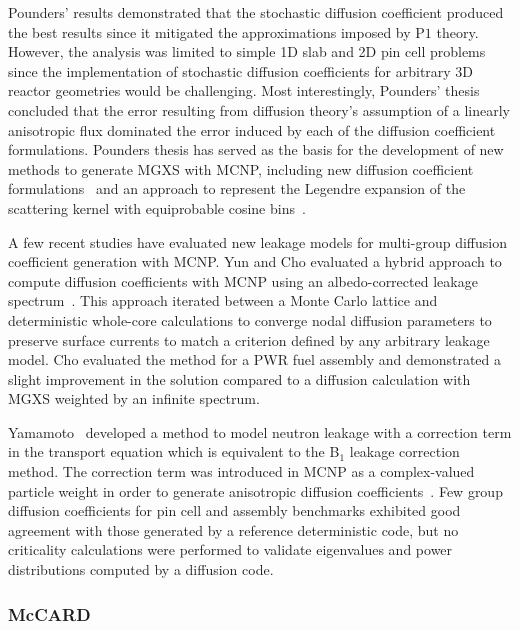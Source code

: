 Pounders' results demonstrated that the stochastic diffusion coefficient produced the best results since it mitigated the approximations imposed by P$1$ theory. However, the analysis was limited to simple 1D slab and 2D pin cell problems since the implementation of stochastic diffusion coefficients for arbitrary 3D reactor geometries would be challenging. Most interestingly, Pounders' thesis concluded that the error resulting from diffusion theory's assumption of a linearly anisotropic flux dominated the error induced by each of the diffusion coefficient formulations. Pounders thesis has served as the basis for the development of new methods to generate \ac{MGXS} with MCNP, including new diffusion coefficient formulations~\cite{pounders2009diffusion} and an approach to represent the Legendre expansion of the scattering kernel with equiprobable cosine bins~\cite{pounders2015history}.

A few recent studies have evaluated new leakage models for multi-group diffusion coefficient generation with MCNP. Yun and Cho evaluated a hybrid approach to compute diffusion coefficients with MCNP using an albedo-corrected leakage spectrum~\cite{cho2009generation,yun2010monte}. This approach iterated between a Monte Carlo lattice and deterministic whole-core calculations to converge nodal diffusion parameters to preserve surface currents to match a criterion defined by any arbitrary leakage model. Cho evaluated the method for a \ac{PWR} fuel assembly and demonstrated a slight improvement in the solution compared to a diffusion calculation with \ac{MGXS} weighted by an infinite spectrum.

Yamamoto~\cite{yamamoto2012buckling} developed a method to model neutron leakage with a correction term in the transport equation which is equivalent to the B$_{1}$ leakage correction method. The correction term was introduced in MCNP as a complex-valued particle weight in order to generate anisotropic diffusion coefficients~\cite{yamamoto2012diff}. Few group diffusion coefficients for pin cell and assembly benchmarks exhibited good agreement with those generated by a reference deterministic code, but no criticality calculations were performed to validate eigenvalues and power distributions computed by a diffusion code.

\subsubsection{McCARD}
\label{subsec:chap3-lit-review-diffusion-mccard}

